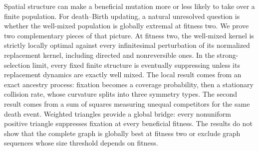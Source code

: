 \documentclass[11pt]{article}
\begin{document}
Spatial structure can make a beneficial mutation more or less likely to take
over a finite population.  For death--Birth updating, a natural unresolved
question is whether the well-mixed population is globally extremal at fitness
two.  We prove two complementary pieces of that picture.  At fitness two,
the well-mixed kernel is strictly locally optimal against every infinitesimal
perturbation of its normalized replacement kernel, including directed and
nonreversible ones.  In the strong-selection limit, every
fixed finite structure is eventually suppressing unless its replacement
dynamics are exactly well mixed.  The local result comes from an exact ancestry process:
fixation becomes a coverage probability, then a stationary collision rate,
whose curvature splits into three symmetry types.  The second result comes
from a sum of squares measuring unequal competitors for the same death event.
Weighted triangles provide a global bridge: every nonuniform positive
triangle suppresses fixation at every beneficial fitness.  The results do not
show that the complete graph is globally best at fitness two or exclude graph
sequences whose size threshold depends on fitness.









\appendix





\end{document}
